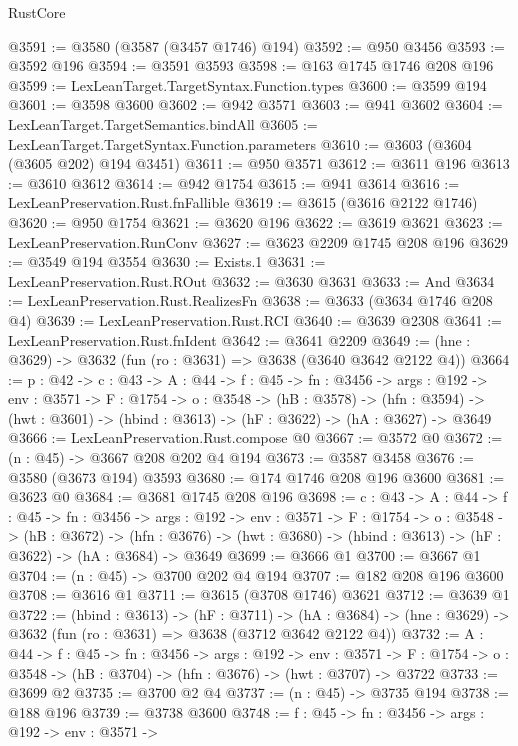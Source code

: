 \begin{lexlean}{RustCore}
\begin{coremodule}
@3591 := @3580 (@3587 (@3457 @1746) @194)
@3592 := @950 @3456
@3593 := @3592 @196
@3594 := @3591 @3593
@3598 := @163 @1745 @1746 @208 @196
@3599 := LexLeanTarget.TargetSyntax.Function.types
@3600 := @3599 @194
@3601 := @3598 @3600
@3602 := @942 @3571
@3603 := @941 @3602
@3604 := LexLeanTarget.TargetSemantics.bindAll
@3605 := LexLeanTarget.TargetSyntax.Function.parameters
@3610 := @3603 (@3604 (@3605 @202) @194 @3451)
@3611 := @950 @3571
@3612 := @3611 @196
@3613 := @3610 @3612
@3614 := @942 @1754
@3615 := @941 @3614
@3616 := LexLeanPreservation.Rust.fnFallible
@3619 := @3615 (@3616 @2122 @1746)
@3620 := @950 @1754
@3621 := @3620 @196
@3622 := @3619 @3621
@3623 := LexLeanPreservation.RunConv
@3627 := @3623 @2209 @1745 @208 @196
@3629 := @3549 @194 @3554
@3630 := Exists.{1}
@3631 := LexLeanPreservation.Rust.ROut
@3632 := @3630 @3631
@3633 := And
@3634 := LexLeanPreservation.Rust.RealizesFn
@3638 := @3633 (@3634 @1746 @208 @4)
@3639 := LexLeanPreservation.Rust.RCI
@3640 := @3639 @2308
@3641 := LexLeanPreservation.Rust.fnIdent
@3642 := @3641 @2209
@3649 := (hne : @3629) -> @3632 (fun (ro : @3631) => @3638 (@3640 @3642 @2122 @4))
@3664 := {p : @42} ->
  {c : @43} ->
  {A : @44} ->
  {f : @45} ->
  {fn : @3456} ->
  {args : @192} ->
  {env : @3571} ->
  {F : @1754} ->
  {o : @3548} ->
  (hB : @3578) ->
  (hfn : @3594) -> (hwt : @3601) -> (hbind : @3613) -> (hF : @3622) -> (hA : @3627) -> @3649
@3666 := LexLeanPreservation.Rust.compose @0
@3667 := @3572 @0
@3672 := (n : @45) -> @3667 @208 @202 @4 @194
@3673 := @3587 @3458
@3676 := @3580 (@3673 @194) @3593
@3680 := @174 @1746 @208 @196 @3600
@3681 := @3623 @0
@3684 := @3681 @1745 @208 @196
@3698 := {c : @43} ->
  {A : @44} ->
  {f : @45} ->
  {fn : @3456} ->
  {args : @192} ->
  {env : @3571} ->
  {F : @1754} ->
  {o : @3548} ->
  (hB : @3672) ->
  (hfn : @3676) -> (hwt : @3680) -> (hbind : @3613) -> (hF : @3622) -> (hA : @3684) -> @3649
@3699 := @3666 @1
@3700 := @3667 @1
@3704 := (n : @45) -> @3700 @202 @4 @194
@3707 := @182 @208 @196 @3600
@3708 := @3616 @1
@3711 := @3615 (@3708 @1746) @3621
@3712 := @3639 @1
@3722 := (hbind : @3613) ->
  (hF : @3711) ->
  (hA : @3684) -> (hne : @3629) -> @3632 (fun (ro : @3631) => @3638 (@3712 @3642 @2122 @4))
@3732 := {A : @44} ->
  {f : @45} ->
  {fn : @3456} ->
  {args : @192} ->
  {env : @3571} ->
  {F : @1754} -> {o : @3548} -> (hB : @3704) -> (hfn : @3676) -> (hwt : @3707) -> @3722
@3733 := @3699 @2
@3735 := @3700 @2 @4
@3737 := (n : @45) -> @3735 @194
@3738 := @188 @196
@3739 := @3738 @3600
@3748 := {f : @45} ->
  {fn : @3456} ->
  {args : @192} ->
  {env : @3571} ->

\end{coremodule}
\end{lexlean}
